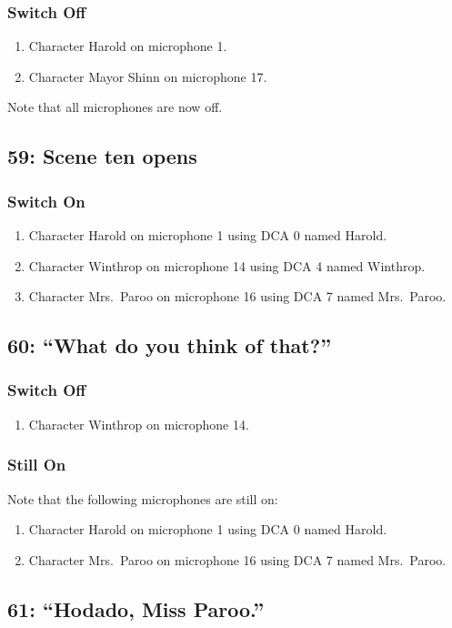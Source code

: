 \subsubsection* {Switch Off}
\begin{enumerate}
\item Character Harold on microphone 1.
\item Character Mayor Shinn on microphone 17.
\end{enumerate}
Note that all microphones are now off.
\subsection* {59: Scene ten opens}
\subsubsection* {Switch On}
\begin{enumerate}
\item Character Harold on microphone 1 using DCA 0 named Harold.
\item Character Winthrop on microphone 14 using DCA 4 named Winthrop.
\item Character Mrs.~Paroo on microphone 16 using DCA 7 named Mrs.~Paroo.
\end{enumerate}
\subsection* {60: ``What do you think of that?''}
\subsubsection* {Switch Off}
\begin{enumerate}
\item Character Winthrop on microphone 14.
\end{enumerate}
\subsubsection* {Still On}
Note that the following microphones are still on:
\begin{enumerate}
\item Character Harold on microphone 1 using DCA 0 named Harold.
\item Character Mrs.~Paroo on microphone 16 using DCA 7 named Mrs.~Paroo.
\end{enumerate}
\subsection* {61: ``Hodado, Miss Paroo.''}
